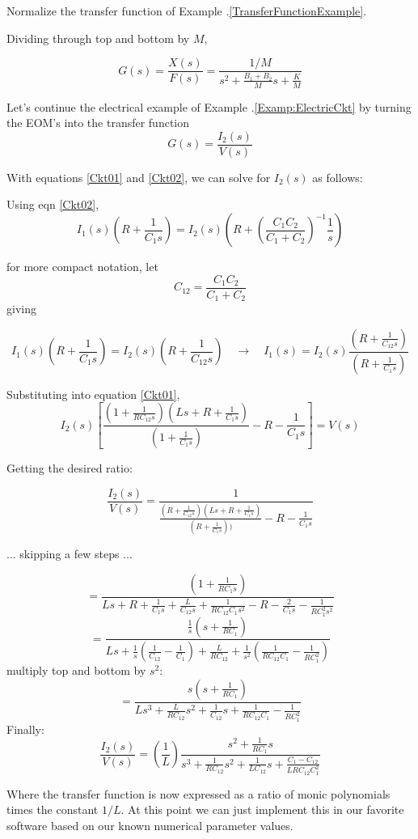 \begin{ExampleSmall}
Normalize the transfer function of Example \thechapter.\ref{TransferFunctionExample}.

Dividing through top and bottom by $M$,

\[
G(s) = \frac {X(s)}{F(s)} = \frac {1/M}{s^2 + \frac{B_1+B_2}{M}s + \frac{K}{M} }
\]
\end{ExampleSmall}

\begin{Example}
Let's continue the electrical example of Example \thechapter.\ref{Examp:ElectricCkt} by turning the
EOM's into the transfer function
\[
G(s) = \frac{I_2(s)}{V(s)}
\]

With equations \ref{Ckt01} and \ref{Ckt02}, we can solve for $I_2(s)$ as follows:

Using eqn \ref{Ckt02},
\[
I_1(s) (R+\frac{1}{C_1s}) = I_2(s)\left(R+ \left ( \frac{C_1C_2}{C_1+C_2}\right)^{-1} \frac{1}{s}\right)
\]

\noindent
for more compact notation, let
\[
C_{12} = \frac{C_1C_2}{C_1+C_2}
\]
giving

\[
I_1(s) \left(R+\frac{1}{C_1s}\right) = I_2(s)\left(R+ \frac{1}{C_{12}s}\right) \quad \to \quad
I_1(s) = I_2(s) \frac  {(R+\frac{1}{C_{12}s})}  {(R+\frac{1}{C_{1}s})}
\]

Substituting into equation \ref{Ckt01},
\[
I_2(s)\left [ \frac{(1+\frac{1}{RC_{12}s})(Ls+R+\frac{1}{C_1s})}{(1+\frac{1}{C_1s})}-R -\frac{1}{C_1s} \right]  = V(s)
\]

Getting the desired ratio:

\[
\frac {I_2(s)} {V(s)}  = \frac{1} { \frac {(R+\frac{1}{C_{12}s})(Ls+R+\frac{1}{C_1s})} {(R+\frac{1}{C_1s}))} -R -\frac{1}{C_1s}     }
\]

... skipping a few steps ...

\[
= \frac  {   (1+\frac{1}{RC_1s})  }  { Ls + R+ \frac{1}{C_1s} + \frac{L}{C_{12}s} + \frac {1}  {RC_{12}C_1s^2} -R -\frac{2}{C_1s}- \frac {1}  {RC_1^2s^2} }
\]
\[
= \frac {\frac{1}{s} ( s + \frac{1}{RC_1})  }
        {Ls + \frac{1}{s}(\frac{1}{C_{12}} - \frac{1}{C_1}) + \frac{L}{RC_{12}} + \frac{1}{s^2}(\frac{1}{RC_{12}C_1}-\frac{1}{RC_1^2})}
\]
multiply top and bottom by $s^2$:
\[
= \frac{s(s+\frac{1}{RC_1})}
       { Ls^3 + \frac{L}{RC_{12}}s^2+\frac{1}{C_{12}}s+\frac{1}{RC_{12}C_1} - \frac{1}{RC_1^2}    }
\]
Finally:
\[
\frac {I_2(s)} {V(s)}  =  \left(\frac{1}{L}\right)
        \frac  {  s^2+\frac{1}{RC_1}s }
        { s^3 + \frac{1}{RC_{12}}s^2 + \frac{1}{LC_{12}}s +
        \frac{C_1-C_{12}}{LRC_{12}C_1^2}     }
\]

Where the transfer function is now expressed as a ratio of monic
polynomials times the constant $1/L$.
At this point we can just implement  this in our favorite software
based on our known numerical  parameter values.
\end{Example}

